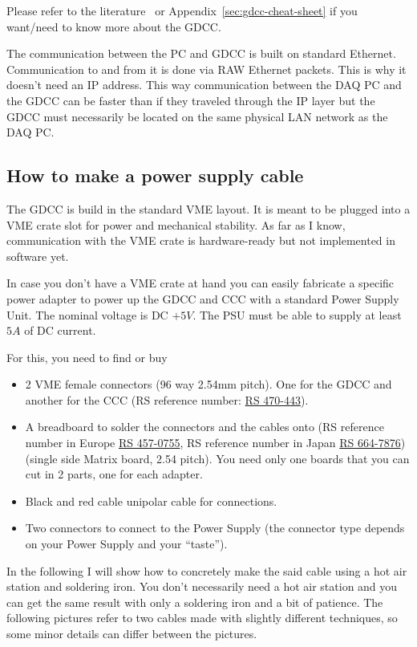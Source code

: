 Please refer to the literature~\cite{GDCC:2012} or
Appendix~\ref{sec:gdcc-cheat-sheet} if you want/need to know more about the
GDCC.

The communication between the PC and GDCC is built on standard
Ethernet. Communication to and from it is done via RAW Ethernet packets. This is
why it doesn't need an IP address. This way communication between the DAQ PC and
the GDCC can be faster than if they traveled through the IP layer but the GDCC
must necessarily be located on the same physical LAN network as the DAQ PC.

\subsection{How to make a power supply cable}
The GDCC is build in the standard VME layout. It is meant to be plugged into a
VME crate slot for power and mechanical stability. As far as I know,
communication with the VME crate is hardware-ready but not implemented in
software yet.

In case you don't have a VME crate at hand you can easily fabricate a specific
power adapter to power up the GDCC and CCC with a standard Power Supply
Unit. The nominal voltage is DC $+5V$. The PSU must be able to supply at least
$5A$ of DC current.

For this, you need to find or buy
\begin{itemize}
\item 2 VME female connectors (96 way 2.54mm pitch). One for the GDCC and
  another for the CCC (RS reference number:
  \href{https://jp.rs-online.com/web/p/din-41612-connectors/0470443/?sra=pstk}{RS
    470-443}).
\item A breadboard to solder the connectors and the cables onto (RS reference
  number in Europe
  \href{https://uk.rs-online.com/web/p/matrix-boards/4570755/}{RS 457-0755}, RS
  reference number in Japan
  \href{https://jp.rs-online.com/web/p/matrix-boards/6647876/?sra=pstk}{RS
    664-7876}) (single side Matrix board, 2.54 pitch). You need only one boards
  that you can cut in 2 parts, one for each adapter.
\item Black and red cable unipolar cable for connections.
\item Two connectors to connect to the Power Supply (the connector type depends
  on your Power Supply and your ``taste'').
\end{itemize}

In the following I will show how to concretely make the said cable using a hot
air station and soldering iron. You don't necessarily need a hot air station and
you can get the same result with only a soldering iron and a bit of
patience. The following pictures refer to two cables made with slightly
different techniques, so some minor details can differ between the pictures.

